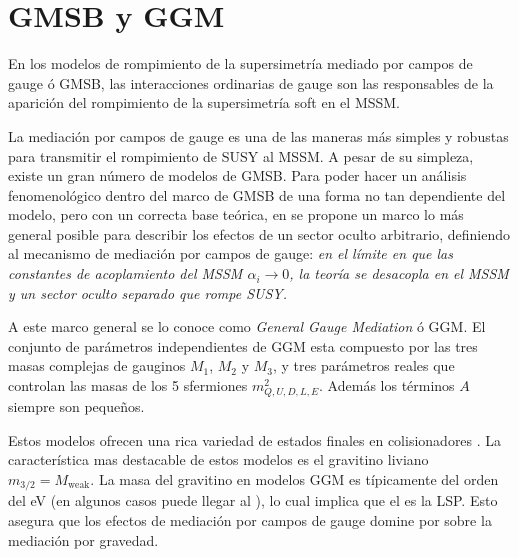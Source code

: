 \section{GMSB y GGM} %

En los modelos de rompimiento de la supersimetría mediado por campos de gauge ó
GMSB, las interacciones ordinarias de gauge son las responsables de la aparición
del rompimiento de la supersimetría soft en el MSSM.


La mediación por campos de gauge es una de las maneras más simples y robustas
para transmitir el rompimiento de SUSY al MSSM. A pesar de su simpleza, existe
un gran número de modelos de GMSB. Para poder hacer un análisis fenomenológico
dentro del marco de GMSB de una forma no tan dependiente del modelo, pero con un
correcta base teórica, en \cite{GGM} se propone un marco lo más general posible
para describir los efectos de un sector oculto arbitrario,
definiendo al mecanismo de mediación por campos de gauge:
\emph{en el límite en que las constantes de acoplamiento del MSSM $\alpha_i \to
  0$, la teoría se desacopla en el MSSM y un sector oculto separado que rompe
  SUSY.}

A este marco general se lo conoce como \emph{General Gauge Mediation} ó GGM. El
conjunto de parámetros independientes de GGM esta compuesto por las tres masas
complejas de gauginos $M_1$, $M_2$ y $M_3$, y tres parámetros reales que
controlan las masas de los 5 sfermiones $m^2_{Q,U,D,L,E}$. Además los términos
$A$ siempre son pequeños.

Estos modelos ofrecen una rica variedad de estados finales en colisionadores
\cite{0911.4130}. La característica mas destacable de estos modelos es el
gravitino liviano $m_{3/2} = M_\text{weak}$. La masa del gravitino en modelos
GGM es típicamente del orden del eV (en algunos casos puede llegar al \gev), lo
cual implica que el {\gravino} es la LSP. Esto asegura que los efectos de
mediación por campos de gauge domine por sobre la mediación por gravedad.

